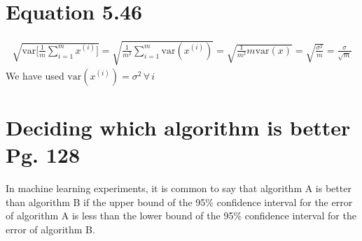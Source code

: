 \documentclass{article}
\newcommand{\ber}{\begin{eqnarray}}
\newcommand{\eer}{\end{eqnarray}}
\begin{document}
\section{Equation 5.46}
\ber
\sqrt{\text{var}\Big[\frac{1}{m}\sum_{i=1}^{m}x^{(i)}\Big]} = \sqrt{\frac{1}{m^2}\sum_{i=1}^{m}\text{var}(x^{(i)})} = \sqrt{\frac{1}{m^2}m\text{var}(x)} = \sqrt{\frac{\sigma^2}{m}} = \frac{\sigma}{\sqrt{m}}
\eer
We have used $\text{var}(x^{(i)})=\sigma^2\,\forall\,i$
\section{Deciding which algorithm is better Pg. 128}
In machine learning experiments, it is common to say that algorithm A is better than algorithm B if the upper bound of the 95\% conﬁdence interval for the error of algorithm A is less than the lower bound of the 95\% conﬁdence interval for the error of algorithm B.
\end{document}

